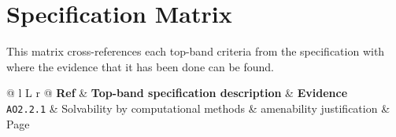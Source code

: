 \section{Specification Matrix}

This matrix cross-references each top-band criteria from the specification with where the evidence that it has been done can be found.

\vspace{1em}

\bgroup
\small
\begin{tabularx}{\textwidth}{@{} l L r @{}}
	\toprule
	\textbf{Ref}     & \textbf{Top-band specification description}                       & \textbf{Evidence}           \\
	\midrule
	\texttt{AO2.2.1} & Solvability by computational methods \& amenability justification & Page \pageref{spec:AO2.2.1} \\
	\bottomrule
\end{tabularx}
\egroup
